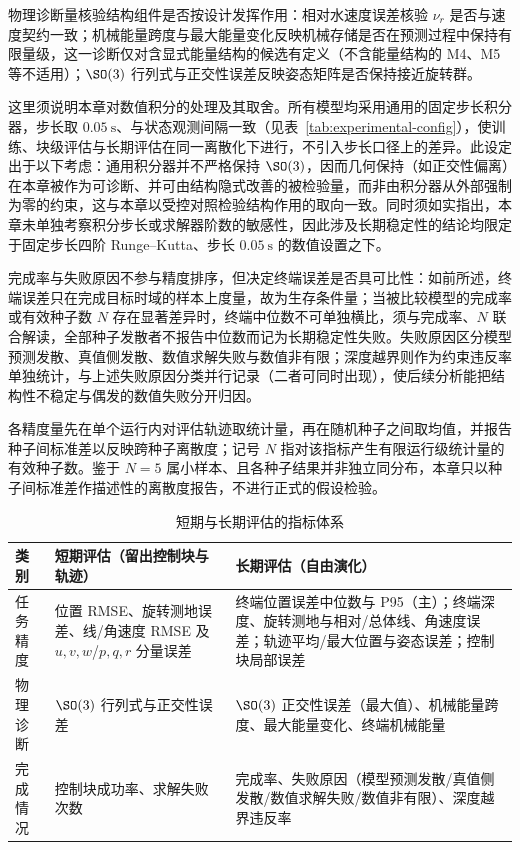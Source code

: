 物理诊断量核验结构组件是否按设计发挥作用：相对水速度误差核验 \(\nu_r\) 是否与速度契约一致；机械能量跨度与最大能量变化反映机械存储是否在预测过程中保持有限量级，这一诊断仅对含显式能量结构的候选有定义（不含能量结构的 M4、M5 等不适用）；\(\SO(3)\) 行列式与正交性误差反映姿态矩阵是否保持接近旋转群。

这里须说明本章对数值积分的处理及其取舍。所有模型均采用通用的固定步长积分器，步长取 \(0.05~\mathrm{s}\)、与状态观测间隔一致（见表~\ref{tab:experimental-config}），使训练、块级评估与长期评估在同一离散化下进行，不引入步长口径上的差异。此设定出于以下考虑：通用积分器并不严格保持 \(\SO(3)\)，因而几何保持（如正交性偏离）在本章被作为可诊断、并可由结构隐式改善的被检验量，而非由积分器从外部强制为零的约束，这与本章以受控对照检验结构作用的取向一致。同时须如实指出，本章未单独考察积分步长或求解器阶数的敏感性，因此涉及长期稳定性的结论均限定于固定步长四阶 Runge--Kutta、步长 \(0.05~\mathrm{s}\) 的数值设置之下。

完成率与失败原因不参与精度排序，但决定终端误差是否具可比性：如前所述，终端误差只在完成目标时域的样本上度量，故为生存条件量；当被比较模型的完成率或有效种子数 \(N\) 存在显著差异时，终端中位数不可单独横比，须与完成率、\(N\) 联合解读，全部种子发散者不报告中位数而记为长期稳定性失败。失败原因区分模型预测发散、真值侧发散、数值求解失败与数值非有限；深度越界则作为约束违反率单独统计，与上述失败原因分类并行记录（二者可同时出现），使后续分析能把结构性不稳定与偶发的数值失败分开归因。

各精度量先在单个运行内对评估轨迹取统计量，再在随机种子之间取均值，并报告种子间标准差以反映跨种子离散度；记号 \(N\) 指对该指标产生有限运行级统计量的有效种子数。鉴于 \(N=5\) 属小样本、且各种子结果并非独立同分布，本章只以种子间标准差作描述性的离散度报告，不进行正式的假设检验。

\begin{table}[htbp]
  \centering
  \caption{短期与长期评估的指标体系}
  \label{tab:metrics}
  \begin{tabularx}{\textwidth}{>{\raggedright\arraybackslash}p{}>{\raggedright\arraybackslash}X>{\raggedright\arraybackslash}X}
    \toprule
    类别 & 短期评估（留出控制块与轨迹） & 长期评估（自由演化） \\
    \midrule
    任务精度 & 位置 RMSE、旋转测地误差、线/角速度 RMSE 及 \(u,v,w\)/\(p,q,r\) 分量误差 & 终端位置误差中位数与 P95（主）；终端深度、旋转测地与相对/总体线、角速度误差；轨迹平均/最大位置与姿态误差；控制块局部误差 \\
    物理诊断 & \(\SO(3)\) 行列式与正交性误差 & \(\SO(3)\) 正交性误差（最大值）、机械能量跨度、最大能量变化、终端机械能量 \\
    完成情况 & 控制块成功率、求解失败次数 & 完成率、失败原因（模型预测发散/真值侧发散/数值求解失败/数值非有限）、深度越界违反率 \\
    \bottomrule
  \end{tabularx}
\end{table}

